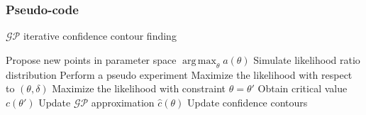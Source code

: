 \documentclass[9pt, aspectratio=169]{beamer}
\DeclareMathOperator*{\argmax}{arg\,max}
\begin{document}
\begin{frame}
\frametitle{Pseudo-code}
\begin{algorithm}[H]
  \caption{$\mathcal{GP}$ iterative confidence contour finding}
  \begin{algorithmic}
    \State Propose new points in parameter space $\argmax_\theta a(\theta)$
    \State Simulate likelihood ratio distribution
    \State Perform a pseudo experiment
    \State Maximize the likelihood with respect to $(\theta, \delta)$
    \State Maximize the likelihood with constraint $\theta=\theta'$
    \EndFor
    \State Obtain critical value $c(\theta')$
    \EndFor
    \State Update $\mathcal{GP}$ approximation $\hat{c}(\theta)$
    \State Update confidence contours
    \EndFor
  \end{algorithmic}
\end{algorithm}
\end{frame}
\end{document}
